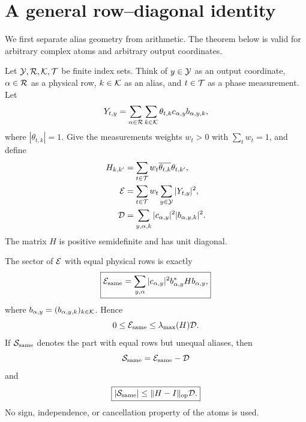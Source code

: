 \section{A general row--diagonal identity}
\label{sec:tpc41-row-diagonal}

We first separate alias geometry from arithmetic.  The theorem below is
valid for arbitrary complex atoms and arbitrary output coordinates.

Let \(\mathcal Y,\mathcal R,\mathcal K,\mathcal T\) be finite index sets.  Think of \(y\in\mathcal Y\) as
an output coordinate, \(\alpha\in\mathcal R\) as a physical row,
\(k\in\mathcal K\) as an alias, and \(t\in\mathcal T\) as a phase measurement.  Let
\begin{equation}
 Y_{t,y}
 =\sum_{\alpha\in\mathcal R}\sum_{k\in\mathcal K}
   \theta_{t,k}c_{\alpha,y}b_{\alpha,y,k},
 \label{eq:tpc41-general-Y}
\end{equation}
where \(|\theta_{t,k}|=1\).  Give the measurements weights \(w_t>0\)
with \(\sum_tw_t=1\), and define
\begin{align}
 H_{k,k'}
 &=\sum_{t\in\mathcal T}w_t
   \overline{\theta_{t,k}}\theta_{t,k'},
 \label{eq:tpc41-general-H}\\
 \mathcal E
 &=\sum_{t\in\mathcal T}w_t\sum_{y\in\mathcal Y}|Y_{t,y}|^2,
 \label{eq:tpc41-general-energy}\\
 \mathcal D
 &=\sum_{y,\alpha,k}|c_{\alpha,y}|^2|b_{\alpha,y,k}|^2.
 \label{eq:tpc41-general-D}
\end{align}
The matrix \(H\) is positive semidefinite and has unit diagonal.

\begin{theorem}
\label{thm:tpc41-row-diagonal-closure}
The sector of \(\mathcal E\) with equal physical rows is exactly
\begin{equation}
 \boxed{
 \mathcal E_{\rm same}
 =\sum_{y,\alpha}|c_{\alpha,y}|^2
   b_{\alpha,y}^{*}Hb_{\alpha,y},}
 \label{eq:tpc41-same-exact}
\end{equation}
where \(b_{\alpha,y}=(b_{\alpha,y,k})_{k\in\mathcal K}\).  Hence
\begin{equation}
 0\le\mathcal E_{\rm same}
 \le\lambda_{\max}(H)\mathcal D.
 \label{eq:tpc41-same-lambda}
\end{equation}
If \(\mathcal S_{\rm same}\) denotes the part with equal rows but unequal
aliases, then
\begin{equation}
 \mathcal S_{\rm same}=\mathcal E_{\rm same}-\mathcal D
 \label{eq:tpc41-same-off-exact}
\end{equation}
and
\begin{equation}
 \boxed{
 |\mathcal S_{\rm same}|
 \le\|H-I\|_{\operatorname{op}}\mathcal D.}
 \label{eq:tpc41-same-off-bound}
\end{equation}
No sign, independence, or cancellation property of the atoms is used.
\end{theorem}

